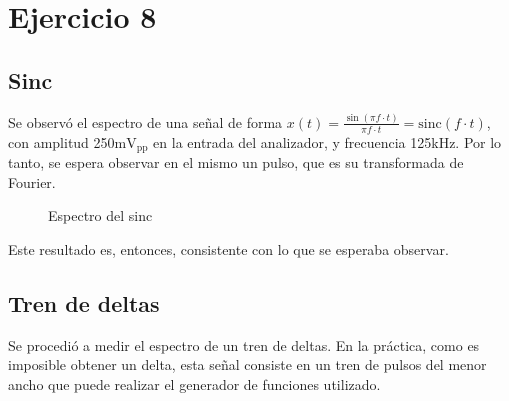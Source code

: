 \documentclass[../../labo_tp5_main.tex]{subfiles}
\begin{document}
\section{Ejercicio 8}

\subsection{Sinc}

Se observ\'o el espectro de una se\~nal de forma $x(t) = \frac{\sin{(\pi f \cdot t)}}{\pi f \cdot t} = \mathrm{sinc}(f\cdot t)$, con amplitud 250m$\mathrm{V}_{\mathrm{pp}}$ en la entrada del analizador, y frecuencia 125kHz. Por lo tanto, se espera observar en el mismo un pulso, que es su transformada de Fourier.

\begin{figure}[H]
	\centering
	\caption{Espectro del sinc}
\end{figure}

Este resultado es, entonces, consistente con lo que se esperaba observar.


\subsection{Tren de deltas}

Se procedi\'o a medir el espectro de un tren de deltas. En la pr\'actica, como es imposible obtener un delta, esta se\~nal consiste en un tren de pulsos del menor ancho que puede realizar el generador de funciones utilizado.
\end{document}
